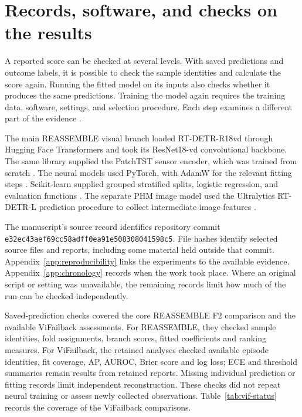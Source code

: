 \section{Records, software, and checks on the results}
\label{sec:ch4-reproducibility}

A reported score can be checked at several levels. With saved predictions and outcome
labels, it is possible to check the sample identities and calculate the score again.
Running the fitted model on its inputs also checks whether it produces the same
predictions. Training the model again requires the training data, software, settings,
and selection procedure. Each step examines a different part of the evidence
\parencite{P009}.

The main REASSEMBLE visual branch loaded RT-DETR-R18vd through Hugging Face Transformers
and took its ResNet18-vd convolutional backbone. The same library supplied the PatchTST
sensor encoder, which was trained from scratch \parencite{Wolf2020Transformers}. The
neural models used PyTorch, with AdamW for the relevant fitting steps
\parencite{Paszke2019PyTorch}. Scikit-learn supplied grouped stratified splits, logistic
regression, and evaluation functions \parencite{Pedregosa2011ScikitLearn}. The separate
PHM image model used the Ultralytics RT-DETR-L prediction procedure to collect
intermediate image features \parencite{UltralyticsRTDETR}.

The manuscript’s source record identifies repository commit
\texttt{e32ec43aef69cc58adff0ea91e508308041598c5}. File hashes identify selected source
files and reports, including some material held outside that commit.
Appendix~\ref{app:reproducibility} links the experiments to the available evidence.
Appendix~\ref{app:chronology} records when the work took place. Where an original script
or setting was unavailable, the remaining records limit how much of the run can be
checked independently.

Saved-prediction checks covered the core REASSEMBLE F2 comparison and the available
ViFailback assessments. For REASSEMBLE, they checked sample identities, fold assignments,
branch scores, fitted coefficients and ranking measures. For ViFailback, the retained
analyses checked available episode identities, fit coverage, AP, AUROC, Brier score and
log loss; ECE and threshold summaries remain results from retained reports. Missing
individual prediction or fitting records limit independent reconstruction. These checks
did not repeat neural training or assess newly collected observations.
Table~\ref{tab:vif-status} records the coverage of the ViFailback comparisons.

